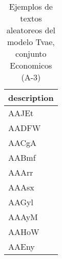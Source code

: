 \begin{table}[H]
\centering
\fontsize{8}{14}\selectfont
\caption{Ejemplos de textos aleatoreos del modelo Tvae, conjunto Economicos (A-3)}
\label{table-sample10-economicos-a-3-tvae-text}
\begin{tabular}{|m{50em}|}
\hline
\rowcolor[gray]{0.8}
description \\
\hline AAJEt \\
\hline AADFW \\
\hline AACgA \\
\hline AABmf \\
\hline AAArr \\
\hline AAAsx \\
\hline AAGyl \\
\hline AAAyM \\
\hline AAHoW \\
\hline AAEny \\
\hline
\end{tabular}
\end{table}
